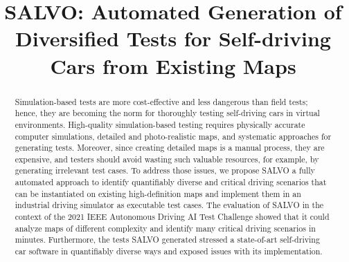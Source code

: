 \documentclass[conference]{IEEEtran}
\begin{document}
\newcommand{\tool}{\textsc{SALVO}\xspace}
\newcommand{\challenge}{2021 IEEE Autonomous Driving AI Test Challenge\xspace}

  {\newcommand{\nb}[2]{
  \fbox{\bfseries\sffamily\scriptsize#1}
     {\sf\small$\blacktriangleright$\textit{\textcolor{red}{#2}}$\blacktriangleleft$}
   }
  }
  {\newcommand{\nb}[2]{}
   \newcommand{\cvsversion}{}
  }

\newcommand\alessio[1]{\nb{Alessio}{#1}} 
\newcommand\vuong[1]{\nb{Vuong}{#1}} 
\newcommand\stefan[1]{\nb{Stefan}{#1}} 

\title{\tool: Automated Generation of Diversified Tests for Self-driving Cars from Existing Maps}



\author{
\and
{}
\and
{}
}

\maketitle

\begin{abstract}
Simulation-based tests are more cost-effective and less dangerous than field tests; hence, they are becoming the norm for thoroughly testing self-driving cars in virtual environments. High-quality simulation-based testing requires physically accurate computer simulations,  detailed and photo-realistic maps, and systematic approaches for generating tests. Moreover, since creating detailed maps is a manual process, they are expensive, and testers should avoid wasting such valuable resources, for example, by generating irrelevant test cases. To address those issues, we propose \tool a fully automated approach to identify quantifiably diverse and critical driving scenarios that can be instantiated on existing high-definition maps and implement them in an industrial driving simulator as executable test cases.
The evaluation of \tool in the context of the \challenge showed that it could analyze maps of different complexity and identify many critical driving scenarios in minutes. Furthermore, the tests \tool generated stressed a state-of-art self-driving car software in quantifiably diverse ways and exposed issues with its implementation.
\end{abstract}
\end{document}
